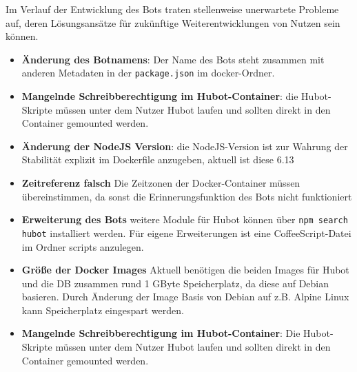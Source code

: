 Im Verlauf der Entwicklung des Bots traten stellenweise unerwartete Probleme auf, deren Lösungsansätze für zukünftige Weiterentwicklungen von Nutzen sein können.
\begin{itemize}
    \item \textbf{Änderung des Botnamens}: Der Name des Bots steht zusammen mit anderen Metadaten in der \texttt{package.json} im docker-Ordner.
    \item \textbf{Mangelnde Schreibberechtigung im Hubot-Container}: die Hubot-Skripte müssen unter dem Nutzer Hubot laufen und sollten direkt in den Container gemounted werden.
    \item \textbf{Änderung der NodeJS Version}: die NodeJS-Version ist zur Wahrung der Stabilität explizit im Dockerfile anzugeben, aktuell ist diese 6.13
    \item \textbf{Zeitreferenz falsch} Die Zeitzonen der Docker-Container müssen übereinstimmen, da sonst die Erinnerungsfunktion des Bots nicht funktioniert
    \item \textbf{Erweiterung des Bots} weitere Module für Hubot können über \texttt{npm search hubot} installiert werden. Für eigene Erweiterungen ist eine CoffeeScript-Datei im Ordner scripts anzulegen.
    \item \textbf{Größe der Docker Images} Aktuell benötigen die beiden Images für Hubot und die DB zusammen rund 1 GByte Speicherplatz, da diese auf Debian basieren. Durch Änderung der Image Basis von Debian auf z.B. Alpine Linux kann Speicherplatz eingespart werden.
    \item \textbf{Mangelnde Schreibberechtigung im Hubot-Container}: Die Hubot-Skripte müssen unter dem Nutzer Hubot laufen und sollten direkt in den Container gemounted werden.

\end{itemize}
